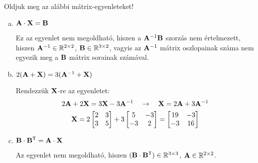 \begin{exercise}{Oldjuk meg az alábbi mátrix-egyenleteket!}
{\begin{enumerate}[a)]
            \tcbline
      \item $\mathbf{A} \cdot \mathbf{X} = \mathbf{B}$

            Ez az egyenlet nem megoldható, hiszen a $\mathbf{A}^{-1} \mathbf{B}$
            szorzás nem értelmezett, hiszen $\mathbf{A}^{-1} \in
              \mathbb R^{2 \times 2}$, $\mathbf{B} \in \mathbb R^{3 \times 2}$,
            vagyis az $\mathbf{A}^{-1}$ mátrix oszlopainak száma nem egyezik meg
            a $\mathbf{B}$ mátrix sorainak számával.

            \tcbline
      \item $2(\mathbf{A} + \mathbf{X}) = 3(\mathbf{A}^{-1} + \mathbf{X})$

            Rendezzük $\mathbf{X}$-re az egyenletet:
            \begin{gather*}
              2 \mathbf{A} + 2 \mathbf{X} = 3 \mathbf{X} - 3 \mathbf{A}^{-1}
              \quad \rightarrow \quad
              \mathbf{X} = 2 \mathbf{A} + 3 \mathbf{A}^{-1}
              \\
              \mathbf{X} = 2 \begin{bmatrix}
                2 & 3 \\ 3 & 5
              \end{bmatrix} + 3 \begin{bmatrix}
                5 & -3 \\ -3 & 2
              \end{bmatrix} = \begin{bmatrix}
                19 & -3 \\ -3 & 16
              \end{bmatrix}
            \end{gather*}

            \tcbline
      \item $\mathbf{B} \cdot \mathbf{B}^{\mathsf T} = \mathbf{A} \cdot \mathbf{X}$

            Az egyenlet nem megoldható, hiszen $(\mathbf{B} \cdot \mathbf{B}^{\mathsf T})
              \in \mathbb R^{3 \times 3}$, $\mathbf{A} \in \mathbb R^{2 \times 2}$.
    \end{enumerate}
  }
\end{exercise}
